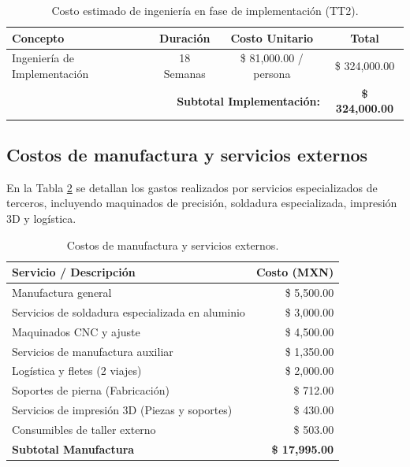 \begin{table}[h!]
	\centering
	\caption{Costo estimado de ingeniería en fase de implementación (TT2).}
	\label{tab:costo_ingenieria_tt2}
	\begin{tabular}{|l|c|c|c|}
		\hline
		\rowcolor[HTML]{C5D9F1} 
		\textbf{Concepto} & \textbf{Duración} & \textbf{Costo Unitario} & \textbf{Total} \\ \hline
		Ingeniería de Implementación & 18 Semanas & \$ 81,000.00 / persona & \$ 324,000.00 \\ \hline
		\multicolumn{3}{|r|}{\textbf{Subtotal Implementación:}} & \textbf{\$ 324,000.00} \\ \hline
	\end{tabular}
\end{table}

\subsection{Costos de manufactura y servicios externos}

En la Tabla \ref{tab:costos_manufactura} se detallan los gastos realizados por servicios especializados de terceros, incluyendo maquinados de precisión, soldadura especializada, impresión 3D y logística.

\begin{table}[h!]
	\centering
	\caption{Costos de manufactura y servicios externos.}
	\label{tab:costos_manufactura}
	\begin{tabular}{|l|r|}
		\hline
		\rowcolor[HTML]{E2EFDA} 
		\textbf{Servicio / Descripción} & \textbf{Costo (MXN)} \\ \hline
		Manufactura general & \$ 5,500.00 \\ \hline
		Servicios de soldadura especializada en aluminio & \$ 3,000.00 \\ \hline
		Maquinados CNC y ajuste & \$ 4,500.00 \\ \hline
		Servicios de manufactura auxiliar & \$ 1,350.00 \\ \hline
		Logística y fletes (2 viajes) & \$ 2,000.00 \\ \hline
		Soportes de pierna (Fabricación) & \$ 712.00 \\ \hline
		Servicios de impresión 3D (Piezas y soportes) & \$ 430.00 \\ \hline
		Consumibles de taller externo & \$ 503.00 \\ \hline
		\textbf{Subtotal Manufactura} & \textbf{\$ 17,995.00} \\ \hline
	\end{tabular}
\end{table}

